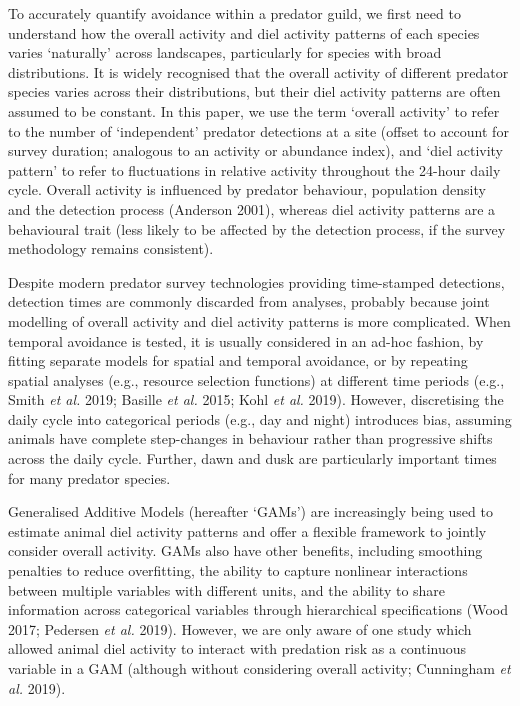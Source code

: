 \documentclass[]{elsarticle} %
\begin{document}
To accurately quantify avoidance within a predator guild, we first need to understand how the overall activity and diel activity patterns of each species varies `naturally' across landscapes, particularly for species with broad distributions. It is widely recognised that the overall activity of different predator species varies across their distributions, but their diel activity patterns are often assumed to be constant. In this paper, we use the term `overall activity' to refer to the number of `independent' predator detections at a site (offset to account for survey duration; analogous to an activity or abundance index), and `diel activity pattern' to refer to fluctuations in relative activity throughout the 24-hour daily cycle. Overall activity is influenced by predator behaviour, population density and the detection process (Anderson 2001), whereas diel activity patterns are a behavioural trait (less likely to be affected by the detection process, if the survey methodology remains consistent).

Despite modern predator survey technologies providing time-stamped detections, detection times are commonly discarded from analyses, probably because joint modelling of overall activity and diel activity patterns is more complicated. When temporal avoidance is tested, it is usually considered in an ad-hoc fashion, by fitting separate models for spatial and temporal avoidance, or by repeating spatial analyses (e.g., resource selection functions) at different time periods (e.g., Smith \emph{et al.} 2019; Basille \emph{et al.} 2015; Kohl \emph{et al.} 2019). However, discretising the daily cycle into categorical periods (e.g., day and night) introduces bias, assuming animals have complete step-changes in behaviour rather than progressive shifts across the daily cycle. Further, dawn and dusk are particularly important times for many predator species.

Generalised Additive Models (hereafter `GAMs') are increasingly being used to estimate animal diel activity patterns and offer a flexible framework to jointly consider overall activity. GAMs also have other benefits, including smoothing penalties to reduce overfitting, the ability to capture nonlinear interactions between multiple variables with different units, and the ability to share information across categorical variables through hierarchical specifications (Wood 2017; Pedersen \emph{et al.} 2019). However, we are only aware of one study which allowed animal diel activity to interact with predation risk as a continuous variable in a GAM (although without considering overall activity; Cunningham \emph{et al.} 2019).
\end{document}
